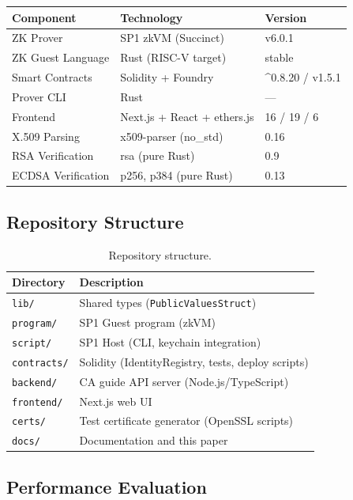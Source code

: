 \documentclass[11pt, a4paper]{article}
\begin{document}
\begin{longtable}[]{@{}lll@{}}
\toprule\noalign{}
Component & Technology & Version \\
\midrule\noalign{}
\endhead
\bottomrule\noalign{}
\endlastfoot
ZK Prover & SP1 zkVM (Succinct) & v6.0.1 \\
ZK Guest Language & Rust (RISC-V target) & stable \\
Smart Contracts & Solidity + Foundry & \^{}0.8.20 / v1.5.1 \\
Prover CLI & Rust & --- \\
Frontend & Next.js + React + ethers.js & 16 / 19 / 6 \\
X.509 Parsing & x509-parser (no\_std) & 0.16 \\
RSA Verification & rsa (pure Rust) & 0.9 \\
ECDSA Verification & p256, p384 (pure Rust) & 0.13 \\
\end{longtable}

\subsection{Repository Structure}\label{repository-structure}

\begin{table}[ht]
\centering
\small
\caption{Repository structure.}
\label{tab:repo-structure}
\begin{tabular}{@{}ll@{}}
\toprule
Directory & Description \\
\midrule
\texttt{lib/} & Shared types (\texttt{PublicValuesStruct}) \\
\texttt{program/} & SP1 Guest program (zkVM) \\
\texttt{script/} & SP1 Host (CLI, keychain integration) \\
\texttt{contracts/} & Solidity (IdentityRegistry, tests, deploy scripts) \\
\texttt{backend/} & CA guide API server (Node.js/TypeScript) \\
\texttt{frontend/} & Next.js web UI \\
\texttt{certs/} & Test certificate generator (OpenSSL scripts) \\
\texttt{docs/} & Documentation and this paper \\
\bottomrule
\end{tabular}
\end{table}

\subsection{Performance Evaluation}\label{performance-evaluation}
\end{document}

